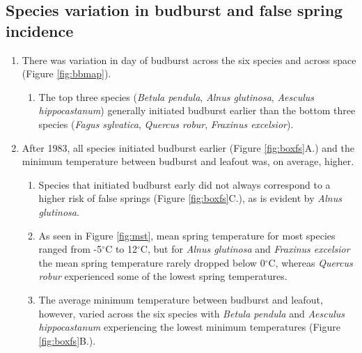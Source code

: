 \documentclass{article}\usepackage[]{graphicx}\usepackage[]{color}
\begin{document}
\subsection*{Species variation in budburst and false spring incidence}
\begin{enumerate}
\item There was variation in day of budburst across the six species and across space (Figure \ref{fig:bbmap}). 
\begin{enumerate}
\item The top three species (\textit{Betula pendula}, \textit{Alnus glutinosa}, \textit{Aesculus hippocastanum}) generally initiated budburst earlier than the bottom three species (\textit{Fagus sylvatica}, \textit{Quercus robur}, \textit{Fraxinus excelsior}).
\end{enumerate}

\item After 1983, all species initiated budburst earlier (Figure \ref{fig:boxfs}A.) and the minimum temperature between budburst and leafout was, on average, higher. 
\begin{enumerate}
\item Species that initiated budburst early did not always correspond to a higher risk of false springs (Figure \ref{fig:boxfs}C.), as is evident by \textit{Alnus glutinosa}.
\item As seen in Figure \ref{fig:mst}, mean spring temperature for most species ranged from -5$^{\circ}$C to 12$^{\circ}$C, but for \textit{Alnus glutinosa} and \textit{Fraxinus excelsior} the mean spring temperature rarely dropped below 0$^{\circ}$C, whereas \textit{Quercus robur} experienced some of the lowest spring temperatures.
\item The average minimum temperature between budburst and leafout, however, varied across the six species with \textit{Betula pendula} and \textit{Aesculus hippocastanum} experiencing the lowest minimum temperatures (Figure \ref{fig:boxfs}B.). 
\end{enumerate}
\end{enumerate}
\end{document}
